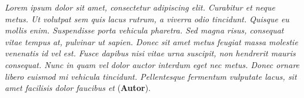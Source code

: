 \vspace*{\fill}

\hspace{\fill}
\begin{minipage}{6cm}
    \begin{singlespace} %
        \textit{Lorem ipsum dolor sit amet, consectetur adipiscing elit. Curabitur et neque metus. Ut volutpat sem quis lacus rutrum, a viverra odio tincidunt. Quisque eu mollis enim. Suspendisse porta vehicula pharetra. Sed magna risus, consequat vitae tempus at, pulvinar ut sapien. Donec sit amet metus feugiat massa molestie venenatis id vel est. Fusce dapibus nisi vitae urna suscipit, non hendrerit mauris consequat. Nunc in quam vel dolor auctor interdum eget nec metus. Donec ornare libero euismod mi vehicula tincidunt. Pellentesque fermentum vulputate lacus, sit amet facilisis dolor faucibus et} (\textbf{Autor}).
    \end{singlespace}
\end{minipage}

\OnesideTwoside{\clearpage}{\cleardoublepage}
